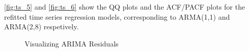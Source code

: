 \documentclass{article}\usepackage[]{graphicx}\usepackage[]{color}
\newenvironment{knitrout}{}{} %
\begin{document}
\autoref{fig:ts_5} and \autoref{fig:ts_6} show the QQ plots and the ACF/PACF plots for the refitted time series regression models, corresponding to ARMA(1,1) and ARMA(2,8) respetively.

\begin{knitrout}
\color{fgcolor}\begin{figure}[H]

{\centering {}

}

\caption[Visualizing ARIMA Residuals]{Visualizing ARIMA Residuals}\label{fig:ts_5}
\end{figure}


\end{knitrout}
\end{document}
